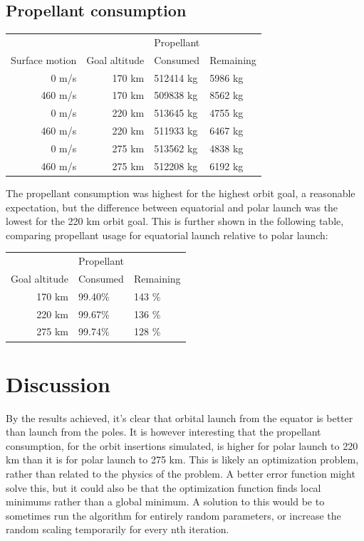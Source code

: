 \documentclass[11pt]{article}
\begin{document}
\subsection{Propellant consumption}
\begin{center}
  \begin{tabular}{ r | r  | l  l  }
     &   &   Propellant   \\
    Surface motion &  Goal altitude & Consumed & Remaining \\
    \hline
    0 m/s & 170 km & 512414 kg & 5986 kg \\
    460 m/s & 170 km & 509838 kg & 8562 kg \\
    \hline
    0 m/s & 220 km & 513645 kg & 4755 kg \\
    460 m/s & 220 km  & 511933 kg & 6467 kg \\
    \hline
    0 m/s & 275 km & 513562 kg & 4838 kg \\
    460 m/s & 275 km & 512208 kg & 6192 kg
  \end{tabular}
\end{center}
The propellant consumption was highest for the highest orbit goal, a reasonable expectation, but the difference between equatorial and polar launch was the lowest for the 220 km orbit goal.
This is further shown in the following table, comparing propellant usage for equatorial launch relative to polar launch:
\begin{center}
  \begin{tabular}{ r | l  l  }
     &   Propellant   \\
    Goal altitude & Consumed & Remaining \\
    \hline
    170 km & 99.40\% & 143 \% \\
    220 km & 99.67\% & 136 \% \\
    275 km & 99.74\% & 128 \%
  \end{tabular}
\end{center}



\section{Discussion}

By the results achieved, it's clear that orbital launch from the equator is better than launch from the poles. 
It is however interesting that the propellant consumption, for the orbit insertions simulated, is higher for polar launch to 220 km than it is for polar launch to 275 km.
This is likely an optimization problem, rather than related to the physics of the problem. A better error function might solve this,
but it could also be that the optimization function finds local minimums rather than a global minimum. 
A solution to this would be to sometimes run the algorithm for entirely random parameters, or increase the random scaling temporarily for every nth iteration. 
\end{document}

